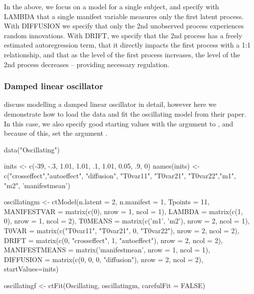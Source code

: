 \documentclass[nojss]{jss}\usepackage[]{graphicx}\usepackage[]{color}
\begin{document}
In the above, we focus on a model for a single subject, and specify with LAMBDA that a single manifest variable measures only the first latent process. With DIFFUSION we specify that only the 2nd unobserved process experiences random innovations. With DRIFT, we specify that the 2nd process has a freely estimated autoregression term, that it directly impacts the first process with a 1:1 relationship, and that as the level of the first process increases, the level of the 2nd process decreases -- providing necessary regulation. 
\subsubsection{Damped linear oscillator}\nopagebreak
\citet{voelkle2013continuous} discuss modelling a damped linear oscillator in detail, however here we demonstrate how to load the data and fit the oscillating model from their paper. In this case, we also specify good starting values with the  argument to , and because of this, set the argument .

\begin{Schunk}
\begin{Sinput}
data("Oscillating")

inits <- c(-39, -.3, 1.01, 1.01, .1, 1.01, 0.05, .9, 0)
names(inits) <- c("crosseffect","autoeffect", "diffusion",
  "T0var11", "T0var21", "T0var22","m1", "m2", 'manifestmean')

oscillatingm <- ctModel(n.latent = 2, n.manifest = 1, Tpoints = 11,
  MANIFESTVAR = matrix(c(0), nrow = 1, ncol = 1),
  LAMBDA = matrix(c(1, 0), nrow = 1, ncol = 2),
  T0MEANS = matrix(c('m1', 'm2'), nrow = 2, ncol = 1),
  T0VAR = matrix(c("T0var11", "T0var21", 0, "T0var22"), nrow = 2, ncol = 2),
  DRIFT = matrix(c(0, "crosseffect", 1, "autoeffect"), nrow = 2, ncol = 2),
  MANIFESTMEANS = matrix('manifestmean', nrow = 1, ncol = 1),
  DIFFUSION = matrix(c(0, 0, 0, "diffusion"), nrow = 2, ncol = 2),
 startValues=inits)

oscillatingf <- ctFit(Oscillating, oscillatingm, carefulFit = FALSE)
\end{Sinput}
\end{Schunk}
\end{document}
